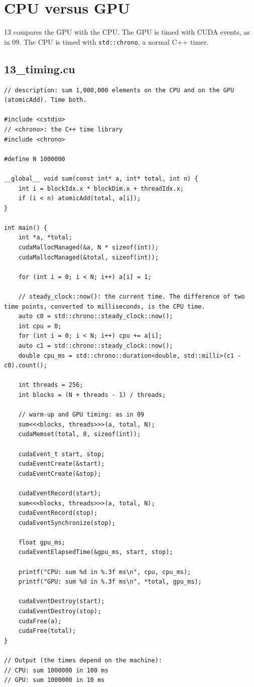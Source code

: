 \documentclass[main.tex]{subfiles}
\begin{document}
\section{CPU versus GPU}
\label{sec:timing}

13 compares the GPU with the CPU. The GPU is timed with CUDA events, as in 09. The CPU is timed with \texttt{std::chrono}, a normal C++ timer.

\subsection{13\_timing.cu}
\begin{lstlisting}[language=CUDA]
// description: sum 1,000,000 elements on the CPU and on the GPU (atomicAdd). Time both.

#include <cstdio>
// <chrono>: the C++ time library
#include <chrono>

#define N 1000000

__global__ void sum(const int* a, int* total, int n) {
    int i = blockIdx.x * blockDim.x + threadIdx.x;
    if (i < n) atomicAdd(total, a[i]);
}

int main() {
    int *a, *total;
    cudaMallocManaged(&a, N * sizeof(int));
    cudaMallocManaged(&total, sizeof(int));

    for (int i = 0; i < N; i++) a[i] = 1;

    // steady_clock::now(): the current time. The difference of two time points, converted to milliseconds, is the CPU time.
    auto c0 = std::chrono::steady_clock::now();
    int cpu = 0;
    for (int i = 0; i < N; i++) cpu += a[i];
    auto c1 = std::chrono::steady_clock::now();
    double cpu_ms = std::chrono::duration<double, std::milli>(c1 - c0).count();

    int threads = 256;
    int blocks = (N + threads - 1) / threads;

    // warm-up and GPU timing: as in 09
    sum<<<blocks, threads>>>(a, total, N);
    cudaMemset(total, 0, sizeof(int));

    cudaEvent_t start, stop;
    cudaEventCreate(&start);
    cudaEventCreate(&stop);

    cudaEventRecord(start);
    sum<<<blocks, threads>>>(a, total, N);
    cudaEventRecord(stop);
    cudaEventSynchronize(stop);

    float gpu_ms;
    cudaEventElapsedTime(&gpu_ms, start, stop);

    printf("CPU: sum %d in %.3f ms\n", cpu, cpu_ms);
    printf("GPU: sum %d in %.3f ms\n", *total, gpu_ms);

    cudaEventDestroy(start);
    cudaEventDestroy(stop);
    cudaFree(a);
    cudaFree(total);
}

// Output (the times depend on the machine):
// CPU: sum 1000000 in 100 ms
// GPU: sum 1000000 in 10 ms
\end{lstlisting}
\end{document}
